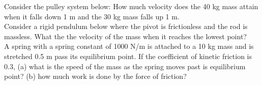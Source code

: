 \documentclass[12pt]{article}
\begin{document}
\pagestyle{empty}
\noindent Consider the pulley system below:  How much velocity does the 40 kg mass attain when it falls down 1 m and the 30 kg mass falls up 1 m.\\
\resizebox{!}{6cm}{}
\newpage
\noindent Consider a rigid pendulum below where the pivot is frictionless and the rod is massless.  What the the velocity of the mass when it reaches the lowest point?\\
\resizebox{12cm}{!}{}
\newpage
\noindent A spring with a spring constant of 1000 N/m is attached to a 10 kg mass and is stretched 0.5 m pass its equilibrium point.  If the coefficient of 
kinetic friction is 0.3, (a) what is the speed of the mass as the spring moves past is equilibrium point?  (b) how much work is done by the force of friction?
\end{document}
